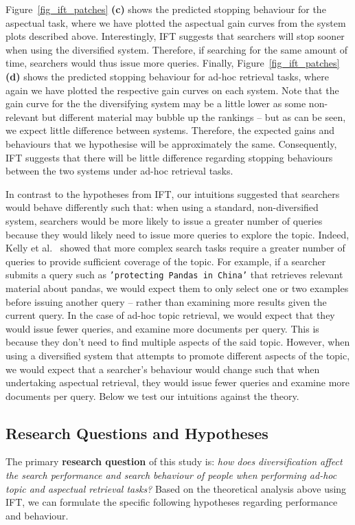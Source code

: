 Figure~\ref{fig_ift_patches} \textbf{(c)} shows the predicted stopping behaviour for the aspectual task, where we have plotted the aspectual gain curves from the system plots described above. Interestingly, IFT suggests that searchers will stop sooner when using the diversified system. Therefore, if searching for the same amount of time, searchers would thus issue more queries. Finally, Figure~\ref{fig_ift_patches} \textbf{(d)} shows the predicted stopping behaviour for ad-hoc retrieval tasks, where again we have plotted the respective gain curves on each system. Note that the gain curve for the the diversifying system may be a little lower as some non-relevant but different material may bubble up the rankings -- but as can be seen, we expect little difference between systems. Therefore, the expected gains and behaviours that we hypothesise will be approximately the same. Consequently, IFT suggests that there will be little difference regarding stopping behaviours between the two systems under ad-hoc retrieval tasks.

In contrast to the hypotheses from IFT, our intuitions suggested that searchers would behave differently such that: when using a standard, non-diversified system, searchers would be more likely to issue a greater number of queries because they would likely need to issue more queries to explore the topic. Indeed, Kelly et al.~\cite{kelly2015search_tasks} showed that more complex search tasks require a greater number of queries to provide sufficient coverage of the topic. For example, if a searcher submits a query such as \texttt{'protecting Pandas in China'} that retrieves relevant material about pandas, we would expect them to only select one or two examples before issuing another query -- rather than examining more results given the current query. In the case of ad-hoc topic retrieval, we would expect that they would issue fewer queries, and examine more documents per query. This is because they don't need to find multiple aspects of the said topic. However, when using a diversified system that attempts to promote different aspects of the topic, we would expect that a searcher's behaviour would change such that when undertaking aspectual retrieval, they would issue fewer queries and examine more documents per query. Below we test our intuitions against the theory.

\subsection{Research Questions and Hypotheses} \label{sec:questions}
The primary \textbf{research question} of this study is: {\it how does diversification affect the search performance and search behaviour of people when performing ad-hoc topic and aspectual retrieval tasks?} Based on the theoretical analysis above using IFT, we can formulate the specific following hypotheses regarding performance and behaviour.

